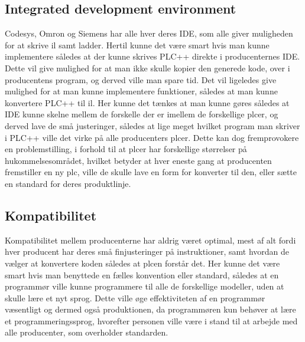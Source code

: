 \subsection*{Integrated development environment}
Codesys, Omron og Siemens har alle hver deres IDE, som alle giver muligheden for at skrive \gls{il} samt ladder.
Hertil kunne det være smart hvis man kunne implementere således at der kunne skrives PLC++ direkte i producenternes IDE. Dette vil give mulighed for at man ikke skulle kopier den generede kode, over i producentens program, og derved ville man spare tid.
Det vil ligeledes give mulighed for at man kunne implementere funktioner, således at man kunne konvertere PLC++ til \gls{il}.
Her kunne det tænkes at man kunne gøres således at IDE kunne skelne mellem de forskelle der er imellem de forskellige \gls{plc}er, og derved lave de små justeringer, således at lige meget hvilket program man skriver i PLC++ ville det virke på alle producenters \gls{plc}er.
Dette kan dog fremprovokere en problemstilling, i forhold til at \gls{plc}er har forskellige størrelser på hukommelsesområdet, hvilket betyder at hver eneste gang at producenten fremstiller en ny \gls{plc}, ville de skulle lave en form for konverter til den, eller sætte en standard for deres produktlinje.

\subsection*{Kompatibilitet}
Kompatibilitet mellem producenterne har aldrig været optimal, mest af alt fordi hver producent har deres små finjusteringer på instruktioner, samt hvordan de vælger at konvertere koden således at \gls{plc}en forstår det.
Her kunne det være smart hvis man benyttede en fælles konvention eller standard, således at en programmør ville kunne programmere til alle de forskellige modeller, uden at skulle lære et nyt sprog.
Dette ville øge effektiviteten af en programmør væsentligt og dermed også produktionen, da programmøren kun behøver at lære et programmeringssprog, hvorefter personen ville være i stand til at arbejde med alle producenter, som overholder standarden.






